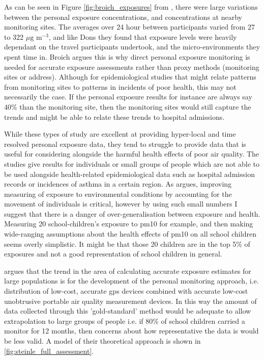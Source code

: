 As can be seen in Figure \ref{fig:broich_exposures} from \cite{Broich2011}, there were large variations between the personal exposure concentrations, and concentrations at nearby monitoring sites. The averages over 24 hour between participants varied from 27 to 322 $\mu \text{g m}^{-3}$, and like Dons they found that exposure levels were heavily dependant on the travel participants undertook, and the micro-environments they spent time in. Broich argues this is why direct personal exposure monitoring is needed for accurate exposure assessments rather than proxy methods (monitoring sites or address). Although for epidemiological studies that might relate patterns from monitoring sites to patterns in incidents of poor health, this may not necessarily the case. If the personal exposure results for instance are always say 40\% than the monitoring site, then the monitoring sites would still capture the trends and might be able to relate these trends to hospital admissions. 

While these types of study are excellent at providing hyper-local and time resolved personal exposure data, they tend to struggle to provide data that is useful for considering alongside the harmful health effects of poor air quality. The studies give results for individuals or small groups of people which are not able to be used alongside health-related epidemiological data such as hospital admission records or incidences of asthma in a certain region. As \cite{Chaix2013} argues, improving measuring of exposure to environmental conditions by accounting for the movement of individuals is critical, however by using such small numbers I suggest that there is a danger of over-generalisation between exposure and health. Measuring 20 school-children's exposure to \gls{pm10} for example, and then making wide-ranging assumptions about the health effects of \gls{pm10} on all school children seems overly simplistic. It might be that those 20 children are in the top 5\% of exposures and not a good representation of school children in general.

\cite{Steinle2013} argues that the trend in the area of calculating accurate exposure estimates for large populations is for the development of the personal monitoring approach, i.e. distribution of low-cost, accurate \gls{gps} devices combined with accurate low-cost unobtrusive portable air quality measurement devices. In this way the amount of data collected through this 'gold-standard' method would be adequate to allow extrapolation to large groups of people i.e. if 80\% of school children carried a monitor for 12 months, then concerns about how representative the data is would be less valid. A model of their theoretical approach is shown in \ref{fig:steinle_full_assessment}.


